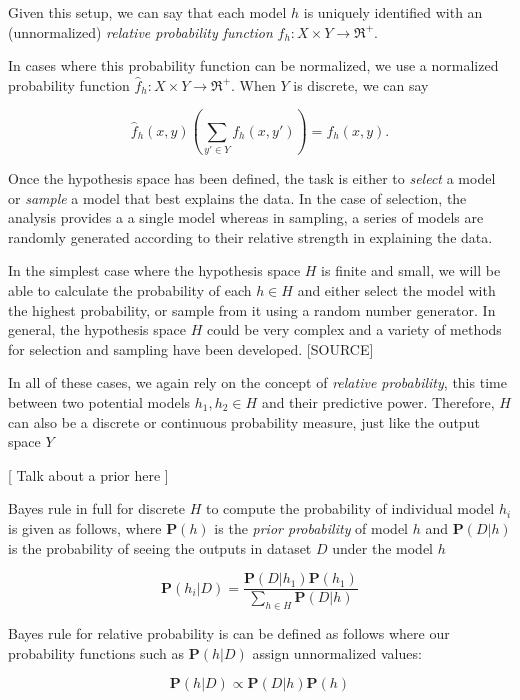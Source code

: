 \documentclass[twoside]{article}
\begin{document}
Given this setup, we can say that each model \(h\) is uniquely identified with an (unnormalized) \textit{relative probability function} \(f_h: X \times Y \rightarrow \Re^+\).

In cases where this probability function can be normalized, we use a normalized probability function \(\hat{f}_h: X \times Y \rightarrow \Re^+\). When \(Y\) is discrete, we can say

\begin{equation}
\label{eq:normalized_probability_model}
\hat{f}_h(x, y)\left(\sum_{y' \in Y} f_h(x,y')\right)=f_h(x, y).
\end{equation}

Once the hypothesis space has been defined, the task is either to \textit{select} a model or \textit{sample} a model that best explains the data. In the case of selection, the analysis provides a a single model whereas in sampling, a series of models are randomly generated according to their relative strength in explaining the data.

In the simplest case where the hypothesis space \(H\) is finite and small, we will be able to calculate the probability of each \(h \in H\) and either select the model with the highest probability, or sample from it using a random number generator. In general, the hypothesis space \(H\) could be very complex and a variety of methods for selection and sampling have been developed. [SOURCE]

In all of these cases, we again rely on the concept of \textit{relative probability}, this time between two potential models \(h_1, h_2 \in H\) and their predictive power. Therefore, \(H\) can also be a discrete or continuous probability measure, just like the output space \(Y\)

[ Talk about a prior here ]

Bayes rule in full for discrete \(H\) to compute the probability of individual model \(h_i\) is given as follows, where \(\mathbf{P}(h)\) is the \textit{prior probability} of model \(h\) and \(\mathbf{P}(D|h)\) is the probability of seeing the outputs in dataset \(D\) under the model \(h\)

\[\mathbf{P}(h_i|D)=\frac{\mathbf{P}(D|h_1)\mathbf{P}(h_1)}{\sum_{h \in H}\mathbf{P}(D|h)}\]

Bayes rule for relative probability is can be defined as follows where our probability functions such as \(\mathbf{P}(h|D)\) assign unnormalized values:

\begin{equation}
\label{eq:bayes}
\mathbf{P}(h|D)\propto\mathbf{P}(D|h)\mathbf{P}(h)
\end{equation}
\end{document}
